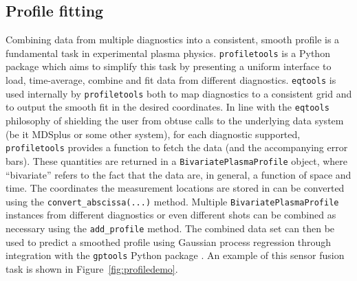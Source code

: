 \documentclass[12pt,floatfix,showpacs]{revtex4-1}
\newcommand{\eqtools}{\texttt{eqtools}\xspace}
\newcommand{\profiletools}{\texttt{profiletools}\xspace}
\newcommand{\gptools}{\texttt{gptools}\xspace}
\begin{document}
\subsection{Profile fitting}
Combining data from multiple diagnostics into a consistent, smooth profile is a fundamental task in experimental plasma physics.
\profiletools \cite{profiletools_git,*profiletools_readthedocs} is a Python package which aims to simplify this task by presenting a uniform interface to load, time-average, combine and fit data from different diagnostics.
\eqtools is used internally by \profiletools both to map diagnostics to a consistent grid and to output the smooth fit in the desired coordinates.
In line with the \eqtools philosophy of shielding the user from obtuse calls to the underlying data system (be it MDSplus or some other system), for each diagnostic supported, \profiletools provides a function to fetch the data (and the accompanying error bars).
These quantities are returned in a \verb|BivariatePlasmaProfile| object, where ``bivariate'' refers to the fact that the data are, in general, a function of space and time.
The coordinates the measurement locations are stored in can be converted using the \verb|convert_abscissa(...)| method.
Multiple \verb|BivariatePlasmaProfile| instances from different diagnostics or even different shots can be combined as necessary using the \verb|add_profile| method.
The combined data set can then be used to predict a smoothed profile using Gaussian process regression \cite{gpr_nf} through integration with the \gptools Python package \cite{gptools_git,*gptools_readthedocs}.
An example of this sensor fusion task is shown in Figure~\ref{fig:profiledemo}.
\end{document}
